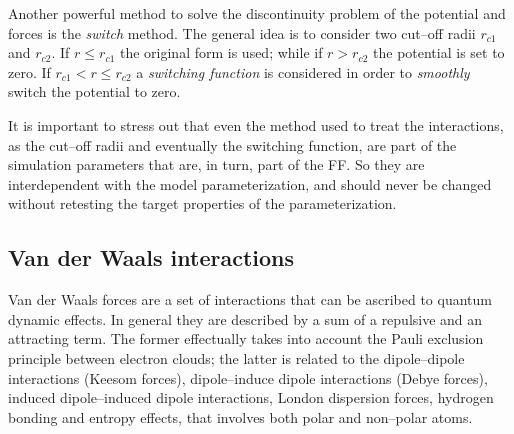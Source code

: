 Another powerful method to solve the discontinuity problem of the potential and forces is the \textit{switch}
method. The general idea is to consider two cut--off radii  $r_{c1}$ and $r_{c2}$. If $r \le r_{c1}$ the original
form is used; while if $r > r_{c2}$ the potential is set to zero. If $r_{c1} < r \le r_{c2}$ a \textit{switching
function} is considered in order to \textit{smoothly} switch the potential to zero.

It is important to stress out that even the method used to treat the interactions, as the cut--off radii and
eventually the switching function, are part of the simulation parameters that are, in turn, part of the \ac{FF}.
So they are interdependent with the model parameterization, and should never be changed without retesting the
target properties of the parameterization.

\subsection{Van der Waals interactions}
Van der Waals forces are a set of interactions that can be ascribed to quantum dynamic effects. In general they
are described by a sum of a repulsive and an attracting term. The former effectually takes into account the Pauli
exclusion principle between electron clouds; the latter is related to the dipole--dipole interactions (Keesom
forces), dipole--induce dipole interactions (Debye forces), induced dipole--induced dipole interactions, London
dispersion forces, hydrogen bonding and entropy effects, that involves both polar and non--polar atoms.

